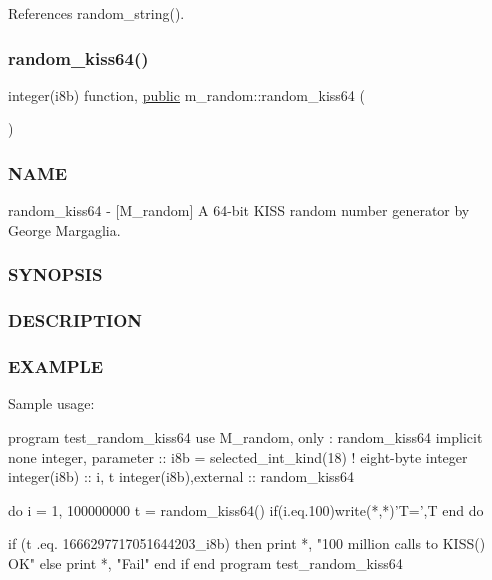 References random\+\_\+string().

\mbox{\label{namespacem__random_a02085190ba5e6a34a61d89800f01a34b}} 
\subsubsection{\texorpdfstring{random\+\_\+kiss64()}{random\_kiss64()}}
{\footnotesize\ttfamily integer(i8b) function, \hyperlink{M__stopwatch_83_8txt_a2f74811300c361e53b430611a7d1769f}{public} m\+\_\+random\+::random\+\_\+kiss64 (\begin{DoxyParamCaption}{ }\end{DoxyParamCaption})}



\subsubsection*{N\+A\+ME}

random\+\_\+kiss64 -\/ \mbox{[}M\+\_\+random\mbox{]} A 64-\/bit K\+I\+SS random number generator by George Margaglia. \subsubsection*{S\+Y\+N\+O\+P\+S\+IS}

\subsubsection*{D\+E\+S\+C\+R\+I\+P\+T\+I\+ON}

\subsubsection*{E\+X\+A\+M\+P\+LE}

\begin{DoxyVerb}Sample usage:

 program test_random_kiss64
 use M_random, only : random_kiss64
   implicit none
   integer, parameter    :: i8b = selected_int_kind(18)  ! eight-byte integer
   integer(i8b)          :: i, t
   integer(i8b),external :: random_kiss64

   do i = 1, 100000000
      t = random_kiss64()
      if(i.eq.100)write(*,*)'T=',T
   end do

   if (t .eq. 1666297717051644203_i8b) then
      print *, "100 million calls to KISS() OK"
   else
      print *, "Fail"
   end if
 end program test_random_kiss64 \end{DoxyVerb}
 \mbox{\label{namespacem__random_aec553bcbd72af521bc24d9f81aea5652}} 
